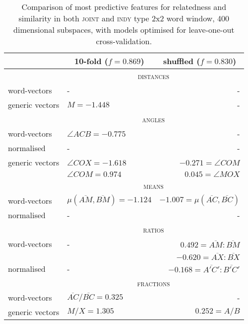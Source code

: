 \begin{table}
\centering
\begin{tabular}{llr}
\hline
& \multicolumn{1}{c}{10-fold ($f = 0.869$)} & \multicolumn{1}{c}{shuffled ($f = 0.830$)} \\
\hline
& \multicolumn{2}{c}{\textsc{distances}} \\
word-vectors& - & - \\
generic vectors & $M = -1.448$ & - \\
\hline
& \multicolumn{2}{c}{\textsc{angles}} \\
word-vectors & $\angle ACB = -0.775$ & - \\
normalised & - & - \\
generic vectors & $\angle COX = -1.618$ & $-0.271 = \angle COM$  \\
& $\angle COM = 0.974$ & $0.045 = \angle MOX$ \\
\hline
& \multicolumn{2}{c}{\textsc{means}} \\
word-vectors & $\mu(\overline{AM},\overline{BM}) = -1.124$ & $-1.007 = \mu(\overline{AC},\overline{BC})$ \\
normalised & - & - \\
\hline
& \multicolumn{2}{c}{\textsc{ratios}} \\
word-vectors & - & $0.492 = \overline{AM}:\overline{BM}$ \\
& & $-0.620 = \overline{AX}:\overline{BX}$ \\
normalised & - & $-0.168 = \overline{A'C'}:\overline{B'C'}$ \\
\hline
& \multicolumn{2}{c}{\textsc{fractions}} \\
word-vectors & $\overline{AC}/\overline{BC} = 0.325$ & - \\
generic vectors & $M/X = 1.305$ & $0.252 = A/B$ \\
\hline
\end{tabular}
\caption{Comparison of most predictive features for relatedness and similarity in both \textsc{joint} and \textsc{indy} type 2x2 word window, 400 dimensional subspaces, with models optimised for leave-one-out cross-validation.}
\label{tab:features}
\end{table}


